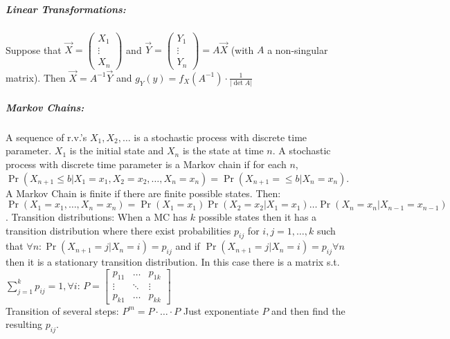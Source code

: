 \documentclass[landscape,10pt]{article}
\begin{document}
\begin{multicols}{4}
 \subparagraph*{Linear Transformations: } Suppose that 
 \(\vec{X} = 
    \begin{pmatrix}
        X_1\\
        \vdots{}\\ 
        X_n
    \end{pmatrix}\) and 
\(\vec{Y} = 
    \begin{pmatrix}
        Y_1\\
        \vdots{} \\
        Y_n
    \end{pmatrix}
    = A\vec{X}\) (with \(A\) a non-singular matrix). Then \(\vec{X} = A^{-1}\vec{Y}\) and \(g_Y(y) = f_X(A^{-1})\cdot\frac{1}{\left|\det A\right|}\)

\subparagraph*{Markov Chains: }
A sequence of r.v.'s \(X_1, X_2, \ldots\) is a stochastic process with discrete time parameter. \(X_1\) is the initial state and \(X_n\) is the state at time \(n\). A stochastic process with discrete time parameter is a Markov chain if for each \(n\), \(\Pr(X_{n+1} \leq b | X_1 = x_1, X_2 = x_2, \ldots, X_n = x_n) = \Pr(X_{n+1} = \leq b | X_n = x_n)\). A Markov Chain is finite if there are finite possible states. Then: \(\Pr(X_1 = x_1, \ldots, X_n = x_n) = \Pr(X_1 = x_1) \Pr(X_2 = x_2 | X_1 = x_1) \ldots \Pr(X_n = x_n | X_{n-1} = x_{n-1}) \). Transition distributions: When a MC has \(k\) possible states then it has a transition distribution where there exist probabilities \(p_{ij}\) for \(i, j = 1, \ldots , k\) such that \(\forall n: \Pr(X_{n+1} = j | X_n = i) = p_{ij}\) and if \(\Pr(X_{n+1} = j | X_n = i) = p_{ij} \forall n\) then it is a stationary transition distribution. In this case there is a matrix s.t. \\ \(\sum\limits_{j=1}^{k}{p_{ij}}=1,  \forall i\):
\(P = \begin{bmatrix} 
        p_{11} & \hdots & p_{1k} \\
        \vdots & \ddots & \vdots \\
         p_{k1} & \hdots & p_{kk}
     \end{bmatrix}\)\\     
Transition of several steps: \(P^m = P \cdot \ldots \cdot P\) Just exponentiate \(P\) and then find the resulting \(p_{ij}\).


\end{multicols}
\end{document}
